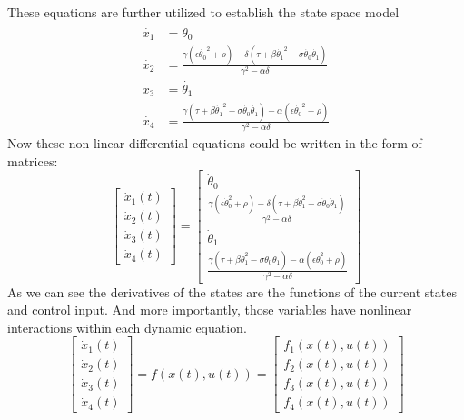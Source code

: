 These equations are further utilized to establish the state
space model
\begin{subequations}
	\begin{align}
	\dot{x_1} &= \dot{\theta_0} \\
	\dot{x_2} &= \frac{\gamma(\epsilon\dot{\theta_0}^2+\rho)-\delta(\tau+\beta\dot{\theta_1}^2-\sigma\dot{\theta_0}\dot{\theta_1})}{\gamma^2-\alpha\delta}\\
	\dot{x_3} &= \dot{\theta_1}\\
	\dot{x_4} &= \frac{\gamma(\tau+\beta\dot{\theta_1}^2-\sigma\dot{\theta_0}\dot{\theta_1})-\alpha(\epsilon\dot{\theta_0}^2+\rho)}{\gamma^2-\alpha\delta}
	\end{align}
\end{subequations}
Now these non-linear differential equations could be written in the form of matrices:
\begin{equation}\label{nonlinmodel}
\begin{bmatrix}
\dot{x}_1(t) \\ \dot{x}_2(t) \\ \dot{x}_3(t) \\ \dot{x}_4(t)
\end{bmatrix} = \begin{bmatrix}
\dot{\theta}_0\\
\frac{\gamma(\epsilon\dot{\theta}_0^2+\rho)-\delta(\tau+\beta\dot{\theta}_1^2-\sigma\dot{\theta}_0\dot{\theta}_1)}{\gamma^2-\alpha\delta}\\
\dot{\theta}_1\\
\frac{\gamma(\tau+\beta\dot{\theta}_1^2-\sigma\dot{\theta}_0\dot{\theta}_1)-\alpha(\epsilon\dot{\theta}_0^2+\rho)}{\gamma^2-\alpha\delta}
\end{bmatrix}
\end{equation}
As we can see the derivatives of the states are the functions of the current states and control input. And more importantly, those variables have nonlinear interactions within each dynamic equation. 
\begin{equation}\begin{bmatrix}
\dot{x}_1(t) \\ \dot{x}_2(t) \\ \dot{x}_3(t) \\ \dot{x}_4(t)
\end{bmatrix} = f(x(t),u(t)) =\begin{bmatrix}f_1(x(t),u(t))\\f_2(x(t),u(t))\\f_3(x(t),u(t))\\f_4(x(t),u(t))\end{bmatrix} \end{equation}
